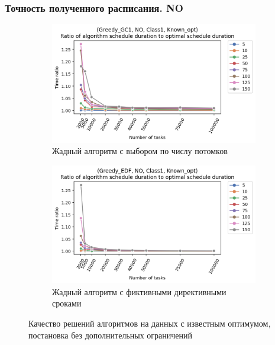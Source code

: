 \begin{frame}
    \frametitle{Точность полученного расписания. NO}
    \begin{figure}
        \begin{subfigure}{0.49\textwidth}
            \includegraphics[width=\textwidth]{imgs/ideal_1/NO/gr_amalgamated.png}
            \caption{Жадный алгоритм с выбором по числу потомков}
        \end{subfigure}
        \begin{subfigure}{0.49\textwidth}
            \includegraphics[width=\textwidth]{imgs/ideal_1/NO_EDF/gr_amalgamated.png}
            \caption{Жадный алгоритм с фиктивными директивными сроками}
        \end{subfigure}
        \caption{Качество решений алгоритмов на данных с известным оптимумом,\\ постановка без дополнительных ограничений}
    \end{figure}
\end{frame}

